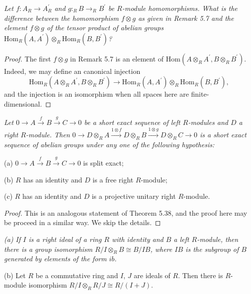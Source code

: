 \begin{problem}\em
Let $f:A_R\to A_R^\prime$ and $g:_RB\to _RB^\prime$ be $R$-module homomorphisms. What is the difference between the homomorphism $f\otimes g$ as given in Remark 5.7 and the element $f\otimes g$ of the tensor product of abelian groups $\mathrm{Hom}_R(A,A^\prime)\otimes_R\mathrm{Hom}_R(B,B^\prime)$?
\end{problem}
\begin{proof}
The first $f\otimes g$ in Remark 5.7 is an element of $\mathrm{Hom}(A\otimes_RA^\prime,B\otimes_RB^\prime)$. Indeed, we may define an canonical injection 
$$\mathrm{Hom}_R(A\otimes_RA^\prime,B\otimes_RB^\prime)\to\mathrm{Hom}_R(A,A^\prime)\otimes_R\mathrm{Hom}_R(B,B^\prime),$$
and the injection is an isomorphism when all spaces here are finite-dimensional.
\end{proof}
\begin{problem}\em
Let $0\longrightarrow A\overset{f}{\longrightarrow}B\overset{g}{\longrightarrow}C\longrightarrow 0$ be a short exact sequence of left $R$-modules and $D$ a right $R$-module. Then $0\longrightarrow D\otimes _RA\overset{1\otimes f}{\longrightarrow}D\otimes _RB\overset{1\otimes g}{\longrightarrow}D\otimes _RC\longrightarrow 0$ is a short exact sequence of abelian groups under any one of the following hypothesis:\par
(a) $0\longrightarrow A\overset{f}{\longrightarrow}B\overset{g}{\longrightarrow}C\longrightarrow 0$ is split exact;\par
(b) $R$ has an identity and $D$ is a free right $R$-module;\par
(c) $R$ has an identity and $D$ is a projective unitary right $R$-module.
\end{problem}
\begin{proof}
This is an analogous statement of Theorem 5.38, and the proof here may be proceed in a similar way. We skip the details.
\end{proof}
\begin{problem}\em
(a) If $I$ is a right ideal of a ring $R$ with identity and $B$ a left $R$-module, then there is a group isomorphism $R/I\otimes_RB\cong B/IB$, where $IB$ is the subgroup of $B$ generated by elements of the form $ib$.\par
(b) Let $R$ be a commutative ring and $I$, $J$ are ideals of $R$. Then there is $R$-module isomorphism $R/I\otimes_RR/J\cong R/(I+J)$.
\end{problem}
